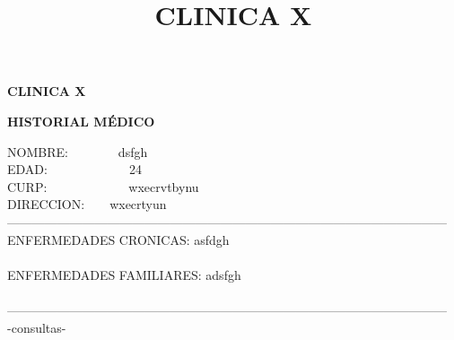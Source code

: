 \documentclass[10pt,a4paper]{letter}
\title{\bf CLINICA X}
\begin{document}
\begin{center}
{\scshape\LARGE \bf CLINICA X\par}
{\bf HISTORIAL MÉDICO\\}
\end{center}
NOMBRE:\ \ \ \ \ \ \ \ dsfgh\\
EDAD:\ \ \ \ \ \ \ \ \ \ \ \ \ 24\\
CURP:\ \ \ \ \ \ \ \ \ \ \ \ \ wxecrvtbynu \\
DIRECCION:\ \ \ \ wxecrtyun\\
--------------------------------------------------------------------------------------------------------- \\
ENFERMEDADES CRONICAS: asfdgh\\ \\
ENFERMEDADES FAMILIARES: adsfgh \\ \\
--------------------------------------------------------------------------------------------------------- \\
-consultas-
\end{document}
